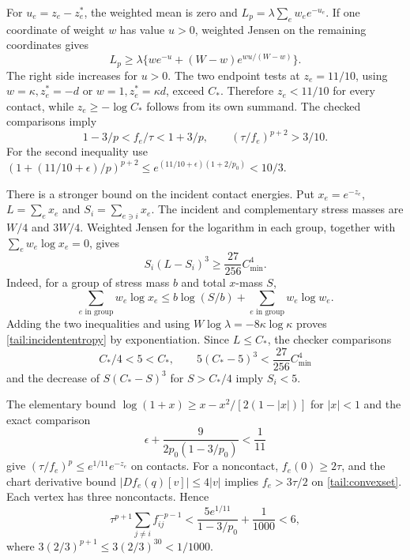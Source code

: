 \documentclass[12pt,reqno]{amsart}
\theoremstyle{definition}
\numberwithin{equation}{section}
\begin{document}
For $u_e=z_e-z_e^*$, the weighted mean is zero and
$L_p=\lambda\sum_ew_ee^{-u_e}$.
If one coordinate of weight $w$ has value $u>0$, weighted Jensen on
the remaining coordinates gives
\[
 L_p\ge\lambda\{we^{-u}+(W-w)e^{wu/(W-w)}\}.
\]
The right side increases for $u>0$. The two endpoint tests at $z_e=11/10$,
using $w=\kappa,z_e^*=-d$ or $w=1,z_e^*=\kappa d$, exceed $C_*$.
Therefore $z_e<11/10$ for every contact, while $z_e\ge-\log C_*$ follows
from its own summand. The checked comparisons imply
\begin{equation}\label{tail:contactbounds}
 1-3/p<f_e/\tau<1+3/p,\qquad (\tau/f_e)^{p+2}>3/10.
\end{equation}
For the second inequality use
$(1+(11/10+\epsilon)/p)^{p+2}\le e^{(11/10+\epsilon)(1+2/p_0)}<10/3$.

There is a stronger bound on the incident contact energies.
Put $x_e=e^{-z_e}$, $L=\sum_ex_e$ and $S_i=\sum_{e\ni i}x_e$.
The incident and complementary stress masses are $W/4$ and $3W/4$.
Weighted Jensen for the logarithm in each group, together with
$\sum_ew_e\log x_e=0$, gives
\begin{equation}\label{tail:incidententropy}
 S_i(L-S_i)^3\ge\frac{27}{256}C_{\min}^4.
\end{equation}
Indeed, for a group of stress mass $b$ and total $x$-mass $S$,
\[
 \sum_{e\text{ in group}}w_e\log x_e
 \le b\log(S/b)+\sum_{e\text{ in group}}w_e\log w_e.
\]
Adding the two inequalities and using
$W\log\lambda=-8\kappa\log\kappa$ proves
\eqref{tail:incidententropy} by exponentiation.
Since $L\le C_*$, the checker comparisons
\[
 C_*/4<5<C_*,\qquad 5(C_*-5)^3<\frac{27}{256}C_{\min}^4
\]
and the decrease of $S(C_*-S)^3$ for $S>C_*/4$ imply $S_i<5$.

The elementary bound
$\log(1+x)\ge x-x^2/[2(1-|x|)]$ for $|x|<1$ and the exact comparison
\[
 \epsilon+\frac9{2p_0(1-3/p_0)}<\frac1{11}
\]
give $(\tau/f_e)^p\le e^{1/11}e^{-z_e}$ on contacts.
For a noncontact, $f_e(0)\ge2\tau$, and the chart derivative bound
$|Df_e(q)[v]|\le4|v|$ implies $f_e>3\tau/2$ on
\eqref{tail:convexset}. Each vertex has three noncontacts. Hence
\begin{equation}\label{tail:incident}
 \tau^{p+1}\sum_{j\ne i}f_{ij}^{-p-1}
 <\frac{5e^{1/11}}{1-3/p_0}+\frac1{1000}<6,
\end{equation}
where $3(2/3)^{p+1}\le3(2/3)^{30}<1/1000$.
\end{document}
